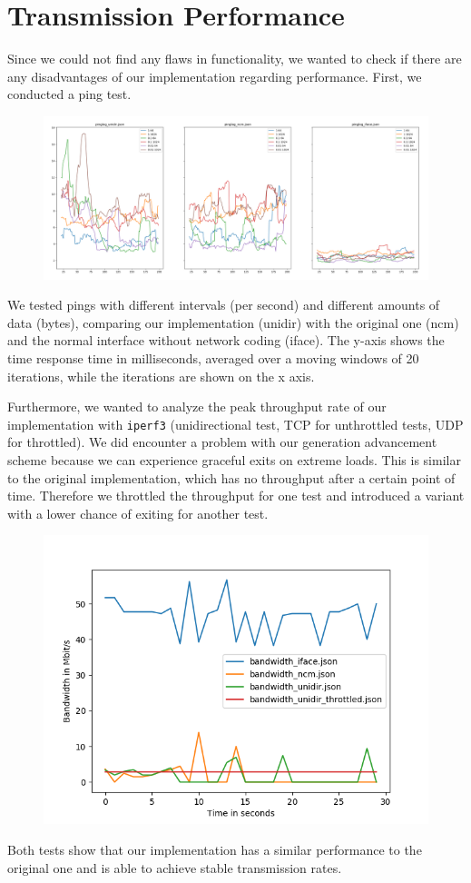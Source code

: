 \documentclass[a4paper, 11pt]{article}
\newcommand{\ilc}[1]{\texttt{#1}} %
\begin{document}
	\section{Transmission Performance}
	Since we could not find any flaws in functionality, we wanted to check if there are any disadvantages of our implementation regarding performance.
	First, we conducted a ping test.
	\begin{figure}[h]
		\centering
		\includegraphics[scale=0.2]{ping_plot}
		\label{ping plot}
	\end{figure}
	We tested pings with different intervals (per second) and different amounts of data (bytes), comparing our implementation (unidir) with the original one (ncm) and the normal interface without network coding (iface). The y-axis shows the time response time in milliseconds, averaged over a moving windows of 20 iterations, while the iterations are shown on the x axis.
	
	Furthermore, we wanted to analyze the peak throughput rate of our implementation with \ilc{iperf3} (unidirectional test, TCP for unthrottled tests, UDP for throttled). We did encounter a problem with our generation advancement scheme because we can experience graceful exits on extreme loads. This is similar to the original implementation, which has no throughput after a certain point of time. Therefore we throttled the throughput for one test and introduced a variant with a lower chance of exiting for another test.
	\begin{figure}[h]
		\centering
		\includegraphics[scale=0.4]{bandwidth_plot}
		\label{ping plot}
	\end{figure}

	Both tests show that our implementation has a similar performance to the original one and is able to achieve stable transmission rates.
\end{document}
